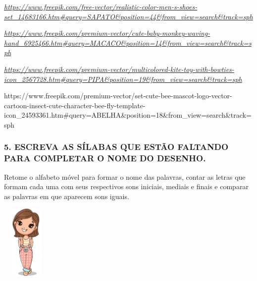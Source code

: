 \href{https://www.freepik.com/free-vector/realistic-color-men-s-shoes-set_14683166.htm\#query=SAPATO\&position=44\&from_view=search\&track=sph}{\emph{https://www.freepik.com/free-vector/realistic-color-men-s-shoes-set\_14683166.htm\#query=SAPATO\&position=44\&from\_view=search\&track=sph}}

\href{https://www.freepik.com/premium-vector/cute-baby-monkey-waving-hand_6925466.htm\#query=MACACO\&position=14\&from_view=search\&track=sph}{\emph{https://www.freepik.com/premium-vector/cute-baby-monkey-waving-hand\_6925466.htm\#query=MACACO\&position=14\&from\_view=search\&track=sph}}

\href{https://www.freepik.com/premium-vector/multicolored-kite-toy-with-bowties-icon_2567728.htm\#query=PIPA\&position=19\&from_view=search\&track=sph}{\emph{https://www.freepik.com/premium-vector/multicolored-kite-toy-with-bowties-icon\_2567728.htm\#query=PIPA\&position=19\&from\_view=search\&track=sph}}

https://www.freepik.com/premium-vector/set-cute-bee-mascot-logo-vector-cartoon-insect-cute-character-bee-fly-template-icon\_24593361.htm\#query=ABELHA\&position=18\&from\_view=search\&track=sph

\subsubsection{5. ESCREVA AS SÍLABAS QUE ESTÃO FALTANDO PARA COMPLETAR O
NOME DO
DESENHO.}\label{escreva-as-suxedlabas-que-estuxe1-faltando-para-completar-o-nome-do-desenho.}

Retome o alfabeto móvel para formar o nome das palavras, contar as
letras que formam cada uma com seus respectivos sons iniciais, mediais e finais e comparar as palavras em que aparecem sons iguais.

\includegraphics[width=0.94792in,height=1.44104in]{media/image17.png}

